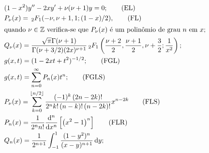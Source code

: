 \documentclass[a4paper,12pt, leqno, answers]{exam}
\begin{document}
\begin{align}
    & (1 - x^2) y'' - 2 x y' + \nu (\nu + 1) y = 0; \tag{EL} \label{eq:legendre} \\
    & P_\nu(x) = \,_2F_1(- \nu, \nu + 1, 1; (1 - x)/2), \tag{FL} \label{eq:legendre_funcao_pri_esp} \\
    \intertext{quando $\nu \in \mathbb{Z}$ verifica-se que $P_\nu(x)$ \'{e} um polin\^{o}mio de grau $n$ em $x$;}
    & Q_\nu(x) = \frac{\sqrt{\pi} \Gamma(\nu + 1)}{\Gamma(\nu + 3/2) (2 x)^{\nu + 1}} \,_2F_1\left(\frac{\nu + 2}{2}, \frac{\nu + 1}{2}, \nu + \frac{3}{2}; \frac{1}{x^2}\right); \label{eq:legendre_funcao_seg_esp} \\
    & g(x, t) = (1 - 2 x t + t^2)^{-1/2}; \tag{FGL} \label{eq:legendre_funcao_geratriz} \\
    & g(x, t) = \sum_{n = 0}^\infty P_n(x) t^n; \tag{FGLS} \label{eq:legendre_funcao_geratriz_serie} \\
    & P_\nu(x) = \sum_{k = 0}^{\lfloor n/2 \rfloor} \frac{(-1)^k \left( 2n - 2k \right)!}{2^n k! \left( n - k \right)! \left( n - 2k \right)!} x^{n - 2k} \tag{FLS} \label{eq:legendre_serie} \\
    & P_n(x) = \frac{1}{2^n n!} \frac{\mathrm{d}^n}{\mathrm{d}x^n}\left[ \left( x^2 - 1 \right)^n \right] \tag{FLR} \label{eq:legendre_rodrigues} \\
    & Q_n(x) = \frac{1}{2^{n + 1}} \int_{-1}^1 \frac{(1 - y^2)^n}{(x - y)^{n + 1}} \,\mathrm{d}y; \label{eq:legendre_funcao_seg_esp_integral} \\

\end{align}
\end{document}
